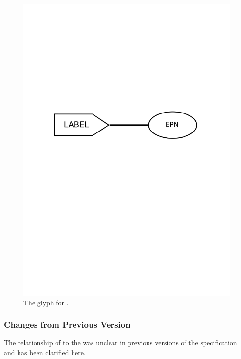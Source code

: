 \begin{figure}[htb]
  \centering
  \includegraphics[scale = 0.4]{images/equivalence}
  \caption{The \PD glyph for .}
  \label{fig:techref:equivalence}
\end{figure}

\subsubsection{Changes from Previous Version}

The relationship of  to the
 was unclear in previous versions of the
specification and has been clarified here.

\label{defn:CloneMarker}
\label{sec:techref:cloneMarker}

